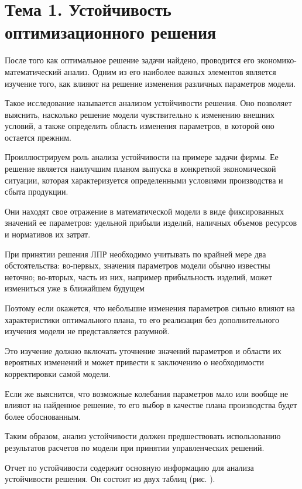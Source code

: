 \section{Тема 1. Устойчивость оптимизационного решения}

После того как оптимальное решение задачи найдено, проводится его экономико-математический анализ. Одним из его наиболее важных элементов является изучение того, как влияют на решение изменения различных параметров модели.

Такое исследование называется анализом устойчивости решения. Оно позволяет выяснить, насколько решение модели чувствительно к изменению внешних условий, а также определить область изменения параметров, в которой оно остается прежним.

Проиллюстрируем роль анализа устойчивости на примере задачи фирмы. Ее решение является наилучшим планом выпуска в конкретной экономической ситуации, которая характеризуется определенными условиями производства и сбыта продукции.

Они находят свое отражение в математической модели в виде фиксированных значений ее параметров: удельной прибыли изделий, наличных объемов ресурсов и нормативов их затрат.

При принятии решения ЛПР необходимо учитывать по крайней мере два обстоятельства: во-первых, значения параметров модели обычно известны неточно; во-вторых, часть из них, например прибыльность изделий, может измениться уже в ближайшем будущем

Поэтому если окажется, что небольшие изменения параметров сильно влияют на характеристики оптимального плана, то его реализация без дополнительного изучения модели не представляется разумной.

Это изучение должно включать уточнение значений параметров и области их вероятных изменений и может привести к заключению о необходимости корректировки самой модели.

Если же выяснится, что возможные колебания параметров мало или вообще не влияют на найденное решение, то его выбор в качестве плана производства будет более обоснованным.

Таким образом, анализ устойчивости должен предшествовать использованию результатов расчетов по модели при принятии управленческих решений.

Отчет по устойчивости содержит основную информацию для анализа устойчивости решения. Он состоит из двух таблиц (рис. ).

